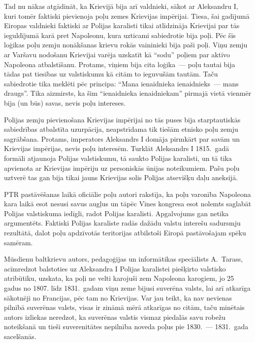 \documentclass[twoside,a5paper,12pt,fleqn,openany]{extbook}
\begin{document}
Tad nu nākas atgādināt, ka Krievijā bija arī valdnieki, sākot ar Aleksandru I, kuri tomēr faktiski pievienoja poļu zemes Krievijas impērijai. Tiesa, šai gadījumā Eiropas valdnieki faktiski ar Polijas karalisti tikai atlīdzināja Krievijai par tās ieguldījumā karā pret Napoleonu, kura uzticami sabiedrotie bija poļi. Pēc šīs loģikas poļu zemju nonākšanas krievu rokās vaininieki bija paši poļi. Viņu zemju ar Varšavu nodošanu Krievijai varēja uzskatīt kā ``sodu'' poļiem par aktīvo Napoleona atbalstīšanu. Protams, viņiem bija cita loģika~--- poļu tautai bija tādas pat tiesības uz valstiskumu kā citām to ieguvušām tautām. Taču sabiedrotie tika meklēti pēc principa: ``Mana ienaidnieka ienaidnieks~--- mans draugs''. Tika aizmirsts, ka šim ``ienaidnieka ienaidniekam'' pirmajā vietā vienmēr bija (un būs) savas, nevis poļu intereses.

Polijas zemju pievienošana Krievijas impērijai no tās puses bija starptautiskās sabiedrības atbalstīta uzurpācija, neapstrīdama tik tiešām etnisko poļu zemju sagrābšana. Protams, imperators Aleksandrs I domāja pirmkārt par savām un Krievijas impērijas, nevis poļu interesēm. Turklāt Aleksandrs I 1815.~gadā formāli atjaunoja Polijas valstiskumu, tā saukto Polijas karalisti, un tā tika apvienota ar Krievijas impēriju uz personiskās ūnijas noteikumiem. Pašu poļu uztverē tas gan bija tikai jauns Krievijas solis Polijas atsevišķu daļu aneksijā.

PTR pastāvēšanas laikā oficiālie poļu autori rakstīja, ka poļu varonība Napoleona kara laikā esot nesusi savus augļus un tāpēc Vīnes kongresa esot nolemts saglabāt Polijas valstiskuma iedīgli, radot Polijas karalisti. Apgalvojums gan netika argumentēts. Faktiski Polijas karaliste radās dažādu valstu interešu sadursmju rezultātā, dalot poļu apdzīvotās teritorijas atbilstoši Eiropā pastāvošajam spēku samēram.

Mūsdienu baltkrievu autors, pedagoģijas un informātikas speciālists A.~Tarass, acīmredzot balstoties uz Aleksandra I Polijas karalistei piešķirto valstisko atribūtiku, uzskata, ka poļi ne velti karojuši zem Napoleona karogiem, jo 25 gadus no 1807. līdz 1831.~gadam viņu zeme bijusi suverēna valsts, lai arī atkarīga sākotnēji no Francijas, pēc tam no Krievijas. Var jau teikt, ka nav nevienas pilnībā suverēnas valsts, visas ir zināmā mērā atkarīgas no citām, taču minētais autors izliekas neredzot, ka suverēnas valstis vismaz piedalās savu robežu noteikšanā un tieši suverenitātes nepilnība noveda poļus pie 1830.~--- 1831.~gada sacelšanās.
\end{document}
